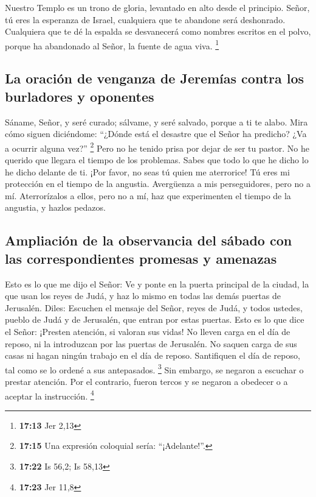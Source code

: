  Nuestro Templo es un trono de gloria, levantado en alto
desde el principio.  Señor, tú eres la esperanza de
Israel, cualquiera que te abandone será deshonrado. Cualquiera que te dé
la espalda se desvanecerá como nombres escritos en el polvo, porque ha
abandonado al Señor, la fuente de agua viva. \footnote{\textbf{17:13}
  Jer 2,13}

\hypertarget{la-oraciuxf3n-de-venganza-de-jeremuxedas-contra-los-burladores-y-oponentes}{%
\subsection{La oración de venganza de Jeremías contra los burladores y
oponentes}\label{la-oraciuxf3n-de-venganza-de-jeremuxedas-contra-los-burladores-y-oponentes}}

 Sáname, Señor, y seré curado; sálvame, y seré salvado,
porque a ti te alabo.  Mira cómo siguen diciéndome:
``¿Dónde está el desastre que el Señor ha predicho? ¿Va a ocurrir alguna
vez?'' \footnote{\textbf{17:15} Una expresión coloquial sería:
  ``¡Adelante!''.}  Pero no he tenido prisa por dejar de
ser tu pastor. No he querido que llegara el tiempo de los problemas.
Sabes que todo lo que he dicho lo he dicho delante de ti.
 ¡Por favor, no seas tú quien me aterrorice! Tú eres mi
protección en el tiempo de la angustia.  Avergüenza a mis
perseguidores, pero no a mí. Aterrorízalos a ellos, pero no a mí, haz
que experimenten el tiempo de la angustia, y hazlos pedazos.

\hypertarget{ampliaciuxf3n-de-la-observancia-del-suxe1bado-con-las-correspondientes-promesas-y-amenazas}{%
\subsection{Ampliación de la observancia del sábado con las
correspondientes promesas y
amenazas}\label{ampliaciuxf3n-de-la-observancia-del-suxe1bado-con-las-correspondientes-promesas-y-amenazas}}

 Esto es lo que me dijo el Señor: Ve y ponte en la puerta
principal de la ciudad, la que usan los reyes de Judá, y haz lo mismo en
todas las demás puertas de Jerusalén.  Diles: Escuchen el
mensaje del Señor, reyes de Judá, y todos ustedes, pueblo de Judá y de
Jerusalén, que entran por estas puertas.  Esto es lo que
dice el Señor: ¡Presten atención, si valoran sus vidas! No lleven carga
en el día de reposo, ni la introduzcan por las puertas de Jerusalén.
 No saquen carga de sus casas ni hagan ningún trabajo en
el día de reposo. Santifiquen el día de reposo, tal como se lo ordené a
sus antepasados. \footnote{\textbf{17:22} Is 56,2; Is 58,13}
 Sin embargo, se negaron a escuchar o prestar atención.
Por el contrario, fueron tercos y se negaron a obedecer o a aceptar la
instrucción. \footnote{\textbf{17:23} Jer 11,8}

